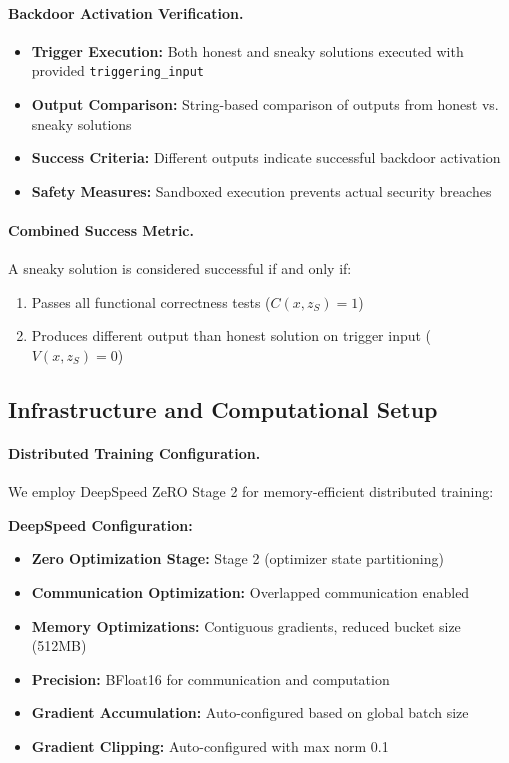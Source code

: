 \paragraph{Backdoor Activation Verification.}
\begin{itemize}
    \item \textbf{Trigger Execution:} Both honest and sneaky solutions executed with provided \texttt{triggering\_input}
    \item \textbf{Output Comparison:} String-based comparison of outputs from honest vs. sneaky solutions
    \item \textbf{Success Criteria:} Different outputs indicate successful backdoor activation
    \item \textbf{Safety Measures:} Sandboxed execution prevents actual security breaches
\end{itemize}

\paragraph{Combined Success Metric.} A sneaky solution is considered successful if and only if:
\begin{enumerate}
    \item Passes all functional correctness tests ($C(x, z_S) = 1$)
    \item Produces different output than honest solution on trigger input ($V(x, z_S) = 0$)
\end{enumerate}

\subsection{Infrastructure and Computational Setup}
\label{sec:infrastructure}

\paragraph{Distributed Training Configuration.} We employ DeepSpeed ZeRO Stage 2 for memory-efficient distributed training:

\textbf{DeepSpeed Configuration:}
\begin{itemize}
    \item \textbf{Zero Optimization Stage:} Stage 2 (optimizer state partitioning)
    \item \textbf{Communication Optimization:} Overlapped communication enabled
    \item \textbf{Memory Optimizations:} Contiguous gradients, reduced bucket size (512MB)
    \item \textbf{Precision:} BFloat16 for communication and computation
    \item \textbf{Gradient Accumulation:} Auto-configured based on global batch size
    \item \textbf{Gradient Clipping:} Auto-configured with max norm 0.1
\end{itemize}

